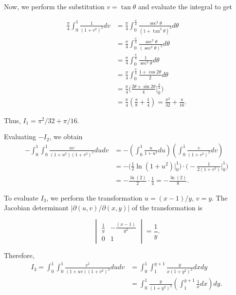 \documentclass{article}
\begin{document}
Now, we perform the substitution $v=\tan\theta$ and evaluate the integral to get 

\begin{align*}
    \frac{\pi}{4}\int_{0}^{1}\frac{1}{(1+v^2)^2}dv&=\frac{\pi}{4}\int_{0}^{\frac{\pi}{4}}\frac{\sec^2\theta}{(1+\tan^2\theta)^2}d\theta \\
    &=\frac{\pi}{4}\int_{0}^{\frac{\pi}{4}}\frac{\sec^2\theta }{(\sec^2\theta)^2}d\theta \\
    &=\frac{\pi}{4}\int_{0}^{\frac{\pi}{4}}\frac{1}{\sec^2\theta}d\theta \\
    &=\frac{\pi}{4}\int_{0}^{\frac{\pi}{4}}\frac{1+\cos2\theta}{2}d\theta \\
    &=\frac{\pi}{4}\Big(\frac{2\theta+\sin2\theta}{4}\Big|_0^\frac{\pi}{4}\Big) \\
    &=\frac{\pi}{4}\left(\frac{\pi}{8}+\frac{1}{4}\right)=\frac{\pi^2}{32}+\frac{\pi}{16}.
\end{align*}

Thus, $I_1=\pi^2/32+\pi/16$.

\vspace{5mm}

Evaluating $-I_2$, we obtain
\begin{align*}
    -\int_{0}^{1}\int_{0}^{1}\frac{uv}{(1+u^2)(1+v^2)^2}dudv&=-\left(\int_{0}^{1}\frac{u}{1+u^2}du\right)\left(\int_{0}^{1}\frac{v}{(1+v^2)^2}dv\right) \\
    &=-\Big(\frac{1}{2}\ln(1+u^2)\Big|_0^1\Big) \cdot \Big(-\frac{1}{2(1+v^2)}\Big|_0^1\Big) \\
    &=-\frac{\ln(2)}{2}\cdot \frac{1}{4}=-\frac{\ln(2)}{8}.
\end{align*}

\vspace{5mm}

To evaluate $I_3$, we perform the transformation $u=(x-1)/y$, $v=y$. The Jacobian determinant $|\partial(u, v)/\partial(x,y)|$ of the transformation is 

\[
\begin{vmatrix}
\frac{1}{y} & -\frac{(x-1)}{y^2} \\
0 & 1
\end{vmatrix} = \frac{1}{y}.
\]

Therefore,
\begin{align*}
    I_3 = \int_{0}^{1}\int_{0}^{1}\frac{v^2}{(1+uv)(1+v^2)^2}dudv&=\int_{0}^{1}\int_{1}^{y+1}\frac{y}{x(1+y^2)^2}dxdy \\ &=\int_{0}^{1}\frac{y}{(1+y^2)^2}\left(\int_{1}^{y+1}\frac{1}{x}dx\right)dy.
\end{align*}
\end{document}
